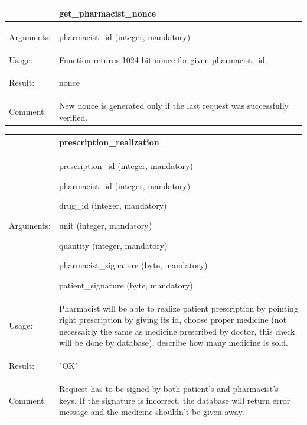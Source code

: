 \subsection{}


    \begin{longtable}{| p{3cm} | p{10.75cm} |}
    \hline
     & get\_pharmacist\_nonce \\ \hline
    Arguments: &  \begin{packed_enum}
    	\item pharmacist\_id (integer, mandatory)
	\end{packed_enum}     \\ \hline
    Usage: & Function returns 1024 bit nonce for given pharmacist\_id. \\ \hline
    Result: & \begin{packed_enum}
    	\item nonce
	\end{packed_enum}     \\ \hline	
			Comment: & New nonce is generated only if the last request was successfully verified.\\ \hline
    \end{longtable}


    \begin{longtable}{| p{3cm} | p{10.75cm} |}
    \hline
     & prescription\_realization \\ \hline
    Arguments: &  \begin{packed_enum}
    	\item prescription\_id (integer, mandatory)
		\item pharmacist\_id (integer, mandatory)
		\item drug\_id (integer, mandatory)
		\item unit (integer, mandatory)
		\item quantity (integer, mandatory)
		\item pharmacist\_signature (byte, mandatory)
		\item patient\_signature (byte, mandatory)

	\end{packed_enum}     \\ \hline
    Usage: & Pharmacist will be able to realize patient prescription by pointing right prescription by giving its id, choose proper medicine (not necessairly the same as medicine prescribed by doctor, this check will be done by database), describe how many medicine is sold.\\ \hline
    Result: & \begin{packed_enum}
    	\item "OK"
	\end{packed_enum}     \\ \hline	
	Comment: & Request has to be signed by both patient's and pharmacist's keys. If the signature is incorrect, the database will return error message and the medicine shouldn't be given away.\\ \hline
    \end{longtable}


